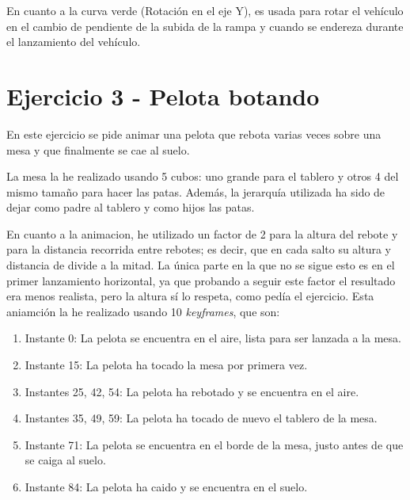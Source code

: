 \documentclass{article}
\begin{document}
En cuanto a la curva verde (Rotación en el eje Y), es usada para rotar el vehículo en el cambio de pendiente de la subida de la rampa y cuando se endereza durante el lanzamiento del vehículo.

\section{Ejercicio 3 - Pelota botando}

En este ejercicio se pide animar una pelota que rebota varias veces sobre una mesa y que finalmente se cae al suelo. 

La mesa la he realizado usando 5 cubos: uno grande para el tablero y otros 4 del mismo tamaño para hacer las patas. Además, la jerarquía utilizada ha sido de dejar como padre al tablero y como hijos las patas.

En cuanto a la animacion, he utilizado un factor de 2 para la altura del rebote y para la distancia recorrida entre rebotes; es decir, que en cada salto su altura y distancia de divide a la mitad. La única parte en la que no se sigue esto es en el primer lanzamiento horizontal, ya que probando a seguir este factor el resultado era menos realista, pero la altura sí lo respeta, como pedía el ejercicio. Esta aniamción la he realizado usando 10 \textit{keyframes}, que son:

\begin{enumerate}
    \item Instante 0: La pelota se encuentra en el aire, lista para ser lanzada a la mesa.
    \item Instante 15: La pelota ha tocado la mesa por primera vez.
    \item Instantes 25, 42, 54: La pelota ha rebotado y se encuentra en el aire.
    \item Instantes 35, 49, 59: La pelota ha tocado de nuevo el tablero de la mesa.
    \item Instante 71: La pelota se encuentra en el borde de la mesa, justo antes de que se caiga al suelo.
    \item Instante 84: La pelota ha caido y se encuentra en el suelo.
\end{enumerate}
\end{document}

